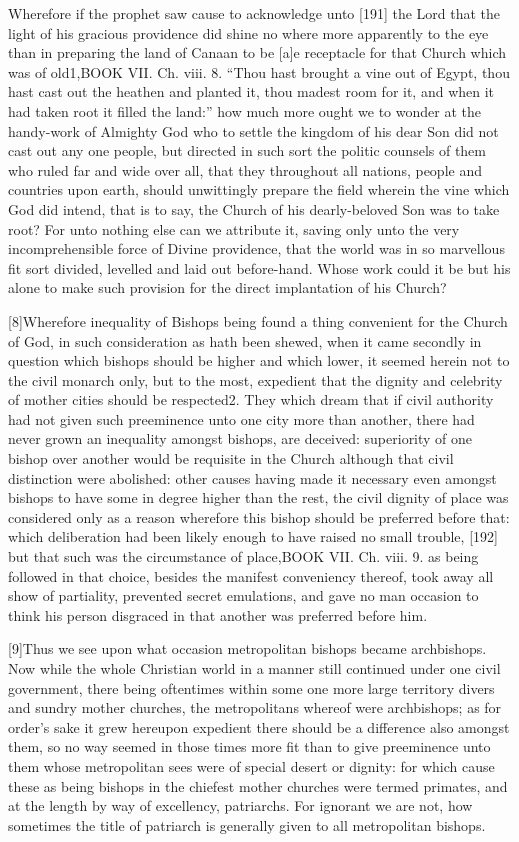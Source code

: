 Wherefore if the prophet saw cause to acknowledge unto [191] the Lord that the light of his gracious providence did shine no where more apparently to the eye than in preparing the land of Canaan to be [a]e receptacle for that Church which was of old1,BOOK VII. Ch. viii. 8. “Thou hast brought a vine out of Egypt, thou hast cast out the heathen and planted it, thou madest room for it, and when it had taken root it filled the land:” how much more ought we to wonder at the handy-work of Almighty God who to settle the kingdom of his dear Son did not cast out any one people, but directed in such sort the politic counsels of them who ruled far and wide over all, that they throughout all nations, people and countries upon earth, should unwittingly prepare the field wherein the vine which God did intend, that is to say, the Church of his dearly-beloved Son was to take root? For unto nothing else can we attribute it, saving only unto the very incomprehensible force of Divine providence, that the world was in so marvellous fit sort divided, levelled and laid out before-hand. Whose work could it be but his alone to make such provision for the direct implantation of his Church?

[8]Wherefore inequality of Bishops being found a thing convenient for the Church of God, in such consideration as hath been shewed, when it came secondly in question which bishops should be higher and which lower, it seemed herein not to the civil monarch only, but to the most, expedient that the dignity and celebrity of mother cities should be respected2. They which dream that if civil authority had not given such preeminence unto one city more than another, there had never grown an inequality amongst bishops, are deceived: superiority of one bishop over another would be requisite in the Church although that civil distinction were abolished: other causes having made it necessary even amongst bishops to have some in degree higher than the rest, the civil dignity of place was considered only as a reason wherefore this bishop should be preferred before that: which deliberation had been likely enough to have raised no small trouble, [192] but that such was the circumstance of place,BOOK VII. Ch. viii. 9. as being followed in that choice, besides the manifest conveniency thereof, took away all show of partiality, prevented secret emulations, and gave no man occasion to think his person disgraced in that another was preferred before him.

[9]Thus we see upon what occasion metropolitan bishops became archbishops. Now while the whole Christian world in a manner still continued under one civil government, there being oftentimes within some one more large territory divers and sundry mother churches, the metropolitans whereof were archbishops; as for order’s sake it grew hereupon expedient there should be a difference also amongst them, so no way seemed in those times more fit than to give preeminence unto them whose metropolitan sees were of special desert or dignity: for which cause these as being bishops in the chiefest mother churches were termed primates, and at the length by way of excellency, patriarchs. For ignorant we are not, how sometimes the title of patriarch is generally given to all metropolitan bishops.

